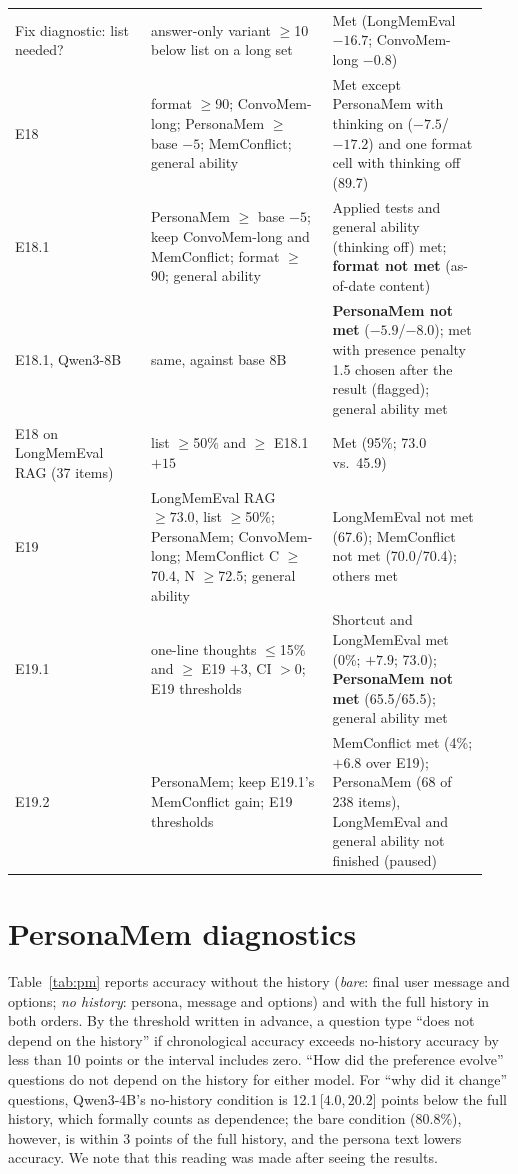 \documentclass[11pt]{article}
\newcommand{\ci}[2]{\,[$#1$,\,$#2$]}
\begin{document}
{\begin{longtable}{@{}>{\raggedright\arraybackslash}p{0.27\linewidth}>{\raggedright\arraybackslash}p{0.36\linewidth}>{\raggedright\arraybackslash}p{0.31\linewidth}@{}}
Fix diagnostic: list needed? & answer-only variant $\geq$10 below list on a long set & Met (LongMemEval $-16.7$; ConvoMem-long $-0.8$) \\
E18 & format $\geq$90; ConvoMem-long; PersonaMem $\geq$ base $-5$; MemConflict; general ability & Met except PersonaMem with thinking on ($-7.5$/$-17.2$) and one format cell with thinking off (89.7) \\
E18.1 & PersonaMem $\geq$ base $-5$; keep ConvoMem-long and MemConflict; format $\geq$90; general ability & Applied tests and general ability (thinking off) met; \textbf{format not met} (as-of-date content) \\
E18.1, Qwen3-8B & same, against base 8B & \textbf{PersonaMem not met} ($-5.9$/$-8.0$); met with presence penalty 1.5 chosen after the result (flagged); general ability met \\
E18 on LongMemEval RAG (37 items) & list $\geq$50\% and $\geq$ E18.1 $+15$ & Met (95\%; 73.0 vs.\ 45.9) \\
E19 & LongMemEval RAG $\geq73.0$, list $\geq$50\%; PersonaMem; ConvoMem-long; MemConflict C $\geq$70.4, N $\geq$72.5; general ability & LongMemEval not met (67.6); MemConflict not met (70.0/70.4); others met \\
E19.1 & one-line thoughts $\leq$15\% and $\geq$ E19 $+3$, CI $>0$; E19 thresholds & Shortcut and LongMemEval met (0\%; $+7.9$; 73.0); \textbf{PersonaMem not met} (65.5/65.5); general ability met \\
E19.2 & PersonaMem; keep E19.1's MemConflict gain; E19 thresholds & MemConflict met (4\%; $+6.8$ over E19); PersonaMem (68 of 238 items), LongMemEval and general ability not finished (paused) \\
\bottomrule
\end{longtable}
}

\section{PersonaMem diagnostics}
\label{app:pmdiag}

Table~\ref{tab:pm} reports accuracy without the history (\emph{bare}: final user message and options; \emph{no history}: persona, message and options) and with the full history in both orders. By the threshold written in advance, a question type ``does not depend on the history'' if chronological accuracy exceeds no-history accuracy by less than 10 points or the interval includes zero. ``How did the preference evolve'' questions do not depend on the history for either model. For ``why did it change'' questions, Qwen3-4B's no-history condition is 12.1\ci{4.0}{20.2} points below the full history, which formally counts as dependence; the bare condition (80.8\%), however, is within 3 points of the full history, and the persona text lowers accuracy. We note that this reading was made after seeing the results.
\end{document}
